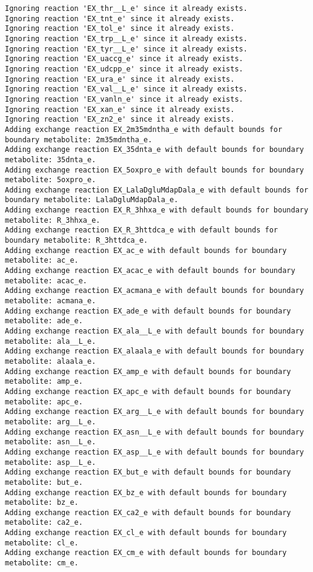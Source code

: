 \documentclass[
  letterpaper,
  DIV=11,
  numbers=noendperiod]{scrartcl}
\begin{document}
\begin{verbatim}
Ignoring reaction 'EX_thr__L_e' since it already exists.
Ignoring reaction 'EX_tnt_e' since it already exists.
Ignoring reaction 'EX_tol_e' since it already exists.
Ignoring reaction 'EX_trp__L_e' since it already exists.
Ignoring reaction 'EX_tyr__L_e' since it already exists.
Ignoring reaction 'EX_uaccg_e' since it already exists.
Ignoring reaction 'EX_udcpp_e' since it already exists.
Ignoring reaction 'EX_ura_e' since it already exists.
Ignoring reaction 'EX_val__L_e' since it already exists.
Ignoring reaction 'EX_vanln_e' since it already exists.
Ignoring reaction 'EX_xan_e' since it already exists.
Ignoring reaction 'EX_zn2_e' since it already exists.
Adding exchange reaction EX_2m35mdntha_e with default bounds for boundary metabolite: 2m35mdntha_e.
Adding exchange reaction EX_35dnta_e with default bounds for boundary metabolite: 35dnta_e.
Adding exchange reaction EX_5oxpro_e with default bounds for boundary metabolite: 5oxpro_e.
Adding exchange reaction EX_LalaDgluMdapDala_e with default bounds for boundary metabolite: LalaDgluMdapDala_e.
Adding exchange reaction EX_R_3hhxa_e with default bounds for boundary metabolite: R_3hhxa_e.
Adding exchange reaction EX_R_3httdca_e with default bounds for boundary metabolite: R_3httdca_e.
Adding exchange reaction EX_ac_e with default bounds for boundary metabolite: ac_e.
Adding exchange reaction EX_acac_e with default bounds for boundary metabolite: acac_e.
Adding exchange reaction EX_acmana_e with default bounds for boundary metabolite: acmana_e.
Adding exchange reaction EX_ade_e with default bounds for boundary metabolite: ade_e.
Adding exchange reaction EX_ala__L_e with default bounds for boundary metabolite: ala__L_e.
Adding exchange reaction EX_alaala_e with default bounds for boundary metabolite: alaala_e.
Adding exchange reaction EX_amp_e with default bounds for boundary metabolite: amp_e.
Adding exchange reaction EX_apc_e with default bounds for boundary metabolite: apc_e.
Adding exchange reaction EX_arg__L_e with default bounds for boundary metabolite: arg__L_e.
Adding exchange reaction EX_asn__L_e with default bounds for boundary metabolite: asn__L_e.
Adding exchange reaction EX_asp__L_e with default bounds for boundary metabolite: asp__L_e.
Adding exchange reaction EX_but_e with default bounds for boundary metabolite: but_e.
Adding exchange reaction EX_bz_e with default bounds for boundary metabolite: bz_e.
Adding exchange reaction EX_ca2_e with default bounds for boundary metabolite: ca2_e.
Adding exchange reaction EX_cl_e with default bounds for boundary metabolite: cl_e.
Adding exchange reaction EX_cm_e with default bounds for boundary metabolite: cm_e.

\end{verbatim}
\end{document}
